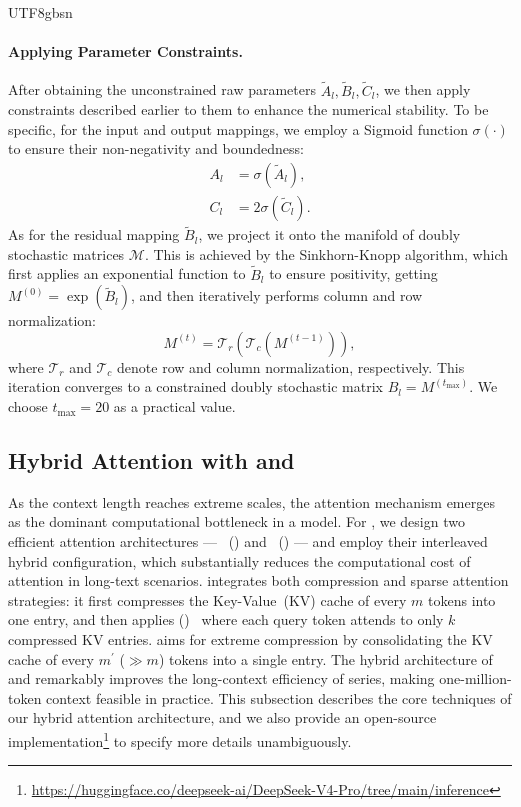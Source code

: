 \begin{CJK*}{UTF8}{gbsn}
\paragraph{Applying Parameter Constraints.}
After obtaining the unconstrained raw parameters $\tilde{A}_l, \tilde{B}_l, \tilde{C}_l$, we then apply constraints described earlier to them to enhance the numerical stability. 
To be specific, for the input and output mappings, we employ a Sigmoid function $\sigma(\cdot)$ to ensure their non-negativity and boundedness:
\begin{align}
    A_l &= \sigma(\tilde{A}_l), \\
    C_l &= 2\sigma(\tilde{C}_l).
\end{align}
As for the residual mapping $\tilde{B}_l$, we project it onto the manifold of doubly stochastic matrices $\mathcal{M}$. 
This is achieved by the Sinkhorn-Knopp algorithm, which first applies an exponential function to $\tilde{B}_l$ to ensure positivity, getting $M^{(0)} = \exp(\tilde{B}_l)$, and then iteratively performs column and row normalization:
\begin{equation}
    M^{(t)} = \mathcal{T}_r(\mathcal{T}_c(M^{(t-1)})),
\end{equation}
where $\mathcal{T}_r$ and $\mathcal{T}_c$ denote row and column normalization, respectively. 
This iteration converges to a constrained doubly stochastic matrix $B_l = M^{(t_{\text{max}})}$. 
We choose $t_{\text{max}} = 20$ as a practical value.

\subsection{Hybrid Attention with \csa{} and \hca{}}

As the context length reaches extreme scales, the attention mechanism emerges as the dominant computational bottleneck in a model.
For \dsviv{}, we design two efficient attention architectures --- \csafull{}~(\csa{}) and \hcafull{}~(\hca{}) --- and employ their interleaved hybrid configuration, which substantially reduces the computational cost of attention in long-text scenarios. 
\csa{} integrates both compression and sparse attention strategies: it first compresses the Key-Value~(KV) cache of every $m$ tokens into one entry, and then applies \dsafull{} (\dsa{})~\citep{dsv32} where each query token attends to only $k$ compressed KV entries.
\hca{} aims for extreme compression by consolidating the KV cache of every $m^{\prime}$ ($\gg m$) tokens into a single entry. 
The hybrid architecture of \csa{} and \hca{} remarkably improves the long-context efficiency of \dsviv{} series, making one-million-token context feasible in practice. 
This subsection describes the core techniques of our hybrid attention architecture, and we also provide an open-source implementation\footnote{\url{https://huggingface.co/deepseek-ai/DeepSeek-V4-Pro/tree/main/inference}} to specify more details unambiguously. 


\end{CJK*}
